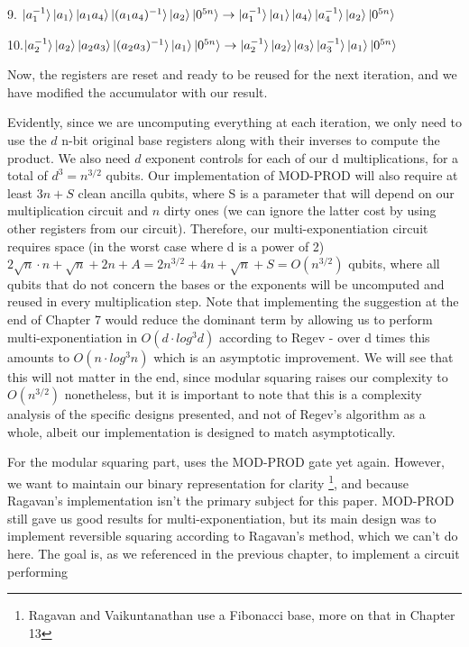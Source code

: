 9. $\ket{a_1^{-1} } \ket{a_1}  \ket{a_1 a_4} \ket{(a_1a_4)^{-1}} \ket{a_2} \ket{0^{5n}} \to \ket{a_1^{-1} } \ket{a_1}  \ket{a_4} \ket{a_4^{-1}} \ket{a_2} \ket{0^{5n}}$

10.$\ket{a_2^{-1}} \ket{a_2}  \ket{a_2 a_3} \ket{(a_2a_3)^{-1}} \ket{a_1} \ket{0^{5n}} \to \ket{a_2^{-1}} \ket{a_2} \ket{a_3} \ket{a_3^{-1}} \ket{a_1} \ket{0^{5n}}$

Now, the registers are reset and ready to be reused for the next iteration, and we have modified the accumulator with our result.

Evidently, since we are uncomputing everything at each iteration, we only need to use the $d$ n-bit original base registers along with their inverses to compute the product. We also need $d$ exponent controls for each of our d multiplications, for a total of $d^3 = n^{3/2}$ qubits.  Our implementation of MOD-PROD will also require at least $3n + S$ clean ancilla qubits, where S is a parameter that will depend on our multiplication circuit and $n$ dirty ones (we can ignore the latter cost by using other registers from our circuit). Therefore, our multi-exponentiation circuit requires space (in the worst case where d is a power of 2) $2 \sqrt{n} \cdot n + \sqrt{n} + 2n + A = 2n^{3/2} + 4n + \sqrt{n} + S = O(n^{3/2})$ qubits, where all qubits that do not concern the bases or the exponents will be uncomputed and reused in every multiplication step. Note that implementing the suggestion at the end of Chapter 7 would reduce the dominant term by allowing us to perform multi-exponentiation in $O(d\cdot log^3d)$ according to Regev - over d times this amounts to $O(n\cdot log^3n)$ which is an asymptotic improvement. We will see that this will not matter in the end, since modular squaring raises our complexity to $O(n^{3/2})$ nonetheless, but it is important to note that this is a complexity analysis of the specific designs presented, and not of Regev's algorithm as a whole, albeit our implementation is designed to match asymptotically. 

For the modular squaring part, \cite{RagavanVaikuntanathan2023} uses the MOD-PROD gate yet again. However, we want to maintain our binary representation for clarity \footnote{Ragavan and Vaikuntanathan use a Fibonacci base, more on that in Chapter 13}, and because Ragavan's implementation isn't the primary subject for this paper. MOD-PROD still gave us good results for multi-exponentiation, but its main design was to implement reversible squaring according to Ragavan's method, which we can't do here. The goal is, as we referenced in the previous chapter, to implement a circuit performing

